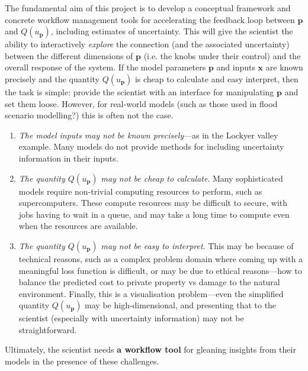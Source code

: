 \documentclass[a4paper,fontsize=12pt]{scrartcl}
\begin{document}
The fundamental aim of this project is to develop a conceptual
framework and concrete workflow management tools for accelerating the
feedback loop between $\mathbf{p}$ and $Q(u_{\mathbf{p}})$, including
estimates of uncertainty. This will give the scientist the ability to
interactively \emph{explore} the connection (and the associated
uncertainty) between the different dimensions of $\mathbf{p}$ (i.e.
the knobs under their control) and the overall response of the
system. If the model
parameters $\mathbf{p}$ and inputs $\mathbf{x}$ are known precisely
and the quantity $Q(u_{\mathbf{p}})$ is cheap to calculate and easy
interpret, then the task is simple: provide the scientist with an
interface for manipulating $\mathbf{p}$ and set them loose. However,
for real-world models (such as those used in flood scenario
modelling?) this is often not the case. 
\begin{enumerate}
  \item \emph{The model inputs may not be known precisely}---as in the
    Lockyer valley example. Many models do not provide methods for
    including uncertainty information in their inputs.
  \item \emph{The quantity $Q(u_{\mathbf{p}})$ may not be cheap to
      calculate}. Many sophisticated models require non-trivial
    computing resources to perform, such as supercomputers. These
    compute resources may be difficult to secure, with jobs having to
    wait in a queue, and may take a long time to compute even when the
    resources are available.
  \item \emph{The quantity $Q(u_{\mathbf{p}})$ may not be easy to
      interpret}. This may be because of technical reasons, such as a
    complex problem domain where coming up with a meaningful loss
    function is difficult, or may be due to ethical reasons---how to
    balance the predicted cost to private property vs damage to the
    natural environment. Finally, this is a visualisation
    problem---even the simplified quantity $Q(u_{\mathbf{p}})$ may be
    high-dimensional, and presenting that to the scientist (especially
    with uncertainty information) may not be straightforward.
\end{enumerate}
Ultimately, the scientist needs \textbf{a workflow tool} for gleaning
insights from their models in the presence of these challenges.
\end{document}

